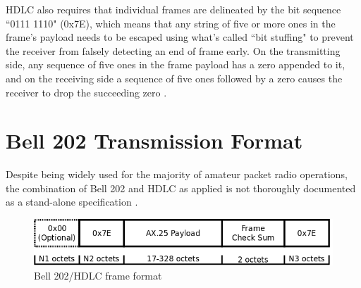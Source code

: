 HDLC also requires that individual frames are delineated by the bit sequence
``0111 1110" (0x7E), which means that any string of five or more ones in the
frame's payload needs to be escaped using what's called ``bit stuffing"
to prevent the receiver from falsely detecting an end of frame early.
On the transmitting side, any sequence of five ones in the frame payload
has a zero appended to it, and on the receiving side a sequence of
five ones followed by a zero causes the receiver to 
drop the succeeding zero \cite[\S3.6]{ax25spec}.


\section{Bell 202 Transmission Format}

Despite being widely used for the majority of amateur packet radio operations, 
the combination of Bell 202 and HDLC as applied is not thoroughly documented 
as a stand-alone specification \cite{n1vgphy}\cite{aprsunveiled}.

\begin{figure}
	\centering
	\includegraphics[width=1.0\textwidth]{src/dia/bell202}
	\caption{Bell 202/HDLC frame format}
	\label{fig:bell202format}
\end{figure}

